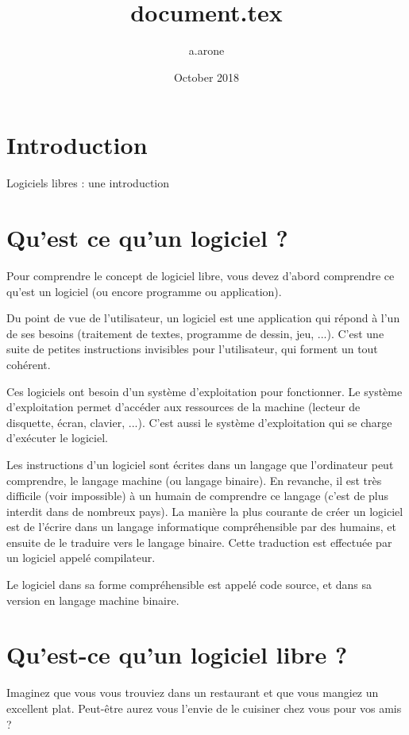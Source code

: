\documentclass{article}
\title{document.tex}
\author{a.arone }
\date{October 2018}
\begin{document}
\maketitle

\section{Introduction}

Logiciels libres : une introduction

\section{Qu'est ce qu'un logiciel ?}

Pour comprendre le concept de logiciel libre, vous devez d'abord comprendre ce qu'est un logiciel (ou encore programme ou application).

Du point de vue de l'utilisateur, un logiciel est une application qui répond à l'un de ses besoins (traitement de textes, programme de dessin, jeu, ...). C'est une suite de petites instructions invisibles pour l'utilisateur, qui forment un tout cohérent.

Ces logiciels ont besoin d'un système d'exploitation pour fonctionner. Le système d'exploitation permet d'accéder aux ressources de la machine (lecteur de disquette, écran, clavier, ...). C'est aussi le système d'exploitation qui se charge d'exécuter le logiciel.

Les instructions d'un logiciel sont écrites dans un langage que l'ordinateur peut comprendre, le langage machine (ou langage binaire). En revanche, il est très difficile (voir impossible) à un humain de comprendre ce langage (c'est de plus interdit dans de nombreux pays). La manière la plus courante de créer un logiciel est de l'écrire dans un langage informatique compréhensible par des humains, et ensuite de le traduire vers le langage binaire. Cette traduction est effectuée par un logiciel appelé compilateur.

Le logiciel dans sa forme compréhensible est appelé code source, et dans sa version en langage machine binaire.
\section{Qu'est-ce qu'un logiciel libre ?}

Imaginez que vous vous trouviez dans un restaurant et que vous mangiez un excellent plat. Peut-être aurez vous l'envie de le cuisiner chez vous pour vos amis ?
\end{document}

